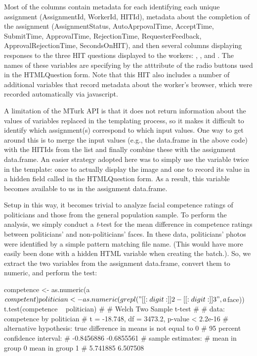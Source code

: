 \noindent Most of the columns contain metadata for each identifying each unique assignment (AssignmentId, WorkerId, HITId), metadata about the completion of the assignment (AssignmentStatus, AutoAprpovalTime, AcceptTime, SubmitTime, ApprovalTime, RejectionTime, RequesterFeedback, ApprovalRejectionTime, SecondsOnHIT), and then several columns displaying responses to the three HIT questions displayed to the workers: , , and . The names of these variables are specifying by the  atttribute of the radio buttons used in the HTMLQuestion form. Note that this HIT also includes a number of additional variables that record metadata about the worker's browser, which were recorded automatically via javascript.

A limitation of the MTurk API is that it does not return information about the values of variables replaced in the templating process, so it makes it difficult to identify which assignment(s) correspond to which input values. One way to get around this is to merge the input values (e.g., the  data.frame in the above code) with the HITIds from the  list and finally combine these with the  assignment data.frame. An easier strategy adopted here was to simply use the  variable twice in the template: once to actually display the image and one to record its value in a hidden field called  in the HTMLQuestion form. As a result, this variable becomes available to us in the assignment data.frame.

Setup in this way, it becomes trivial to analyze facial competence ratings of politicians and those from the general population sample. To perform the analysis, we simply conduct a \textit{t}-test for the mean difference in competence ratings between politicians' and non-politicians' faces. In these data, politicians' photos were identified by a simple pattern matching file name. (This would have more easily been done with a hidden HTML variable when creating the batch.). So, we extract the two variables from the assignment data.frame, convert them to numeric, and perform the test:


\begin{example}
competence <- as.numeric(a$competent)
politician <- as.numeric(grepl("[[:digit:]]{2}-[[:digit:]]{3}", a$face))
t.test(competence ~ politician)
# 
#         Welch Two Sample t-test
# 
# data:  competence by politician
# t = -18.748, df = 3473.2, p-value < 2.2e-16
# alternative hypothesis: true difference in means is not equal to 0
# 95 percent confidence interval:
#  -0.8456886 -0.6855561
# sample estimates:
# mean in group 0 mean in group 1 
#        5.741885        6.507508
\end{example}

